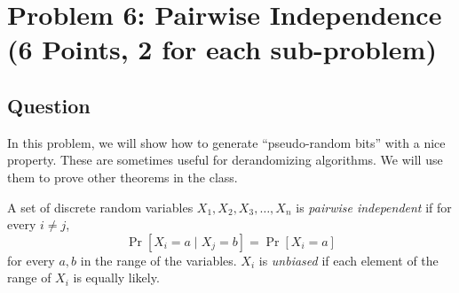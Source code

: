 \documentclass{article}
\def \poly{\text{poly}}
\begin{document}





\newpage
\section*{Problem 6: Pairwise Independence (6 Points, 2 for each sub-problem)}  

\subsection*{Question}
In this problem, we will show how to generate ``pseudo-random bits'' with a nice property. These are sometimes useful for derandomizing algorithms. We will use them to prove other theorems in the class.

A set of discrete random variables $X_1, X_2, X_3, \ldots, X_n$ is {\em pairwise independent} if for every $i \neq j$,
\[\Pr[ X_i = a \mid X_j = b ] = \Pr[ X_i = a]\] for every $a,b$ in the range of the variables.
$X_i$ is {\em unbiased} if each element of the range of $X_i$ is equally likely.
\end{document}
